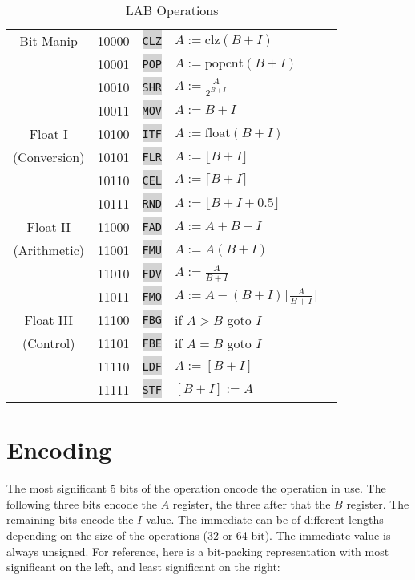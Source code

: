 \documentclass{article}
\newcommand{\labcode}[1]{\colorbox{lightgray}{\lstinline[language=lab]{#1}}}
\begin{document}
\begin{table}[h!]
\begin{tabular}{cclll}
    Bit-Manip   & 10000 & \labcode{CLZ} & $A := \mbox{clz}(B + I)$ \\
                & 10001 & \labcode{POP} & $A := \mbox{popcnt}(B + I)$ \\
                & 10010 & \labcode{SHR} & $A := \frac{A}{2^{B + I}}$ \\
                & 10011 & \labcode{MOV} & $A := B + I$ \\ \midrule
    Float I     & 10100 & \labcode{ITF} & $A := \mbox{float}(B + I)$ \\
    (Conversion)& 10101 & \labcode{FLR} & $A := \lfloor B + I \rfloor$ \\
                & 10110 & \labcode{CEL} & $A := \lceil B + I \rceil$ \\
                & 10111 & \labcode{RND} & $A := \lfloor B + I + 0.5 \rfloor$ \\ \midrule
    Float II    & 11000 & \labcode{FAD} & $A := A + B + I$ \\
    (Arithmetic)& 11001 & \labcode{FMU} & $A := A(B + I)$ \\
                & 11010 & \labcode{FDV} & $A := \frac{A}{B + I}$ \\
                & 11011 & \labcode{FMO} & $A := A - (B + I) \lfloor \frac{A}{B + I} \rfloor$ \\ \midrule
    Float III   & 11100 & \labcode{FBG} & if $A > B$ goto $I$ \\
    (Control)   & 11101 & \labcode{FBE} & if $A = B$ goto $I$ \\
                & 11110 & \labcode{LDF} & $A := [B + I]$ \\
                & 11111 & \labcode{STF} & $[B + I] := A$ \\ \midrule
\end{tabular}
\caption{LAB Operations}
\label{table:operations}
\end{table}

\section{Encoding}

The most significant 5 bits of the operation oncode the operation in use. The
following three bits encode the $A$ register, the three after that the $B$
register. The remaining bits encode the $I$ value. The immediate can be of
different lengths depending on the size of the operations (32 or 64-bit). The
immediate value is always unsigned. For reference, here is a bit-packing
representation with most significant on the left, and least significant on the
right:
\end{document}
